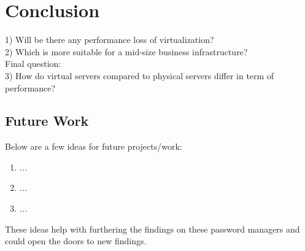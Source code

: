 \section{Conclusion}



        1) Will be there any performance loss of virtualization?\\

        2) Which is more suitable for a mid-size business infrastructure?\\

        Final question:\\
        3) How do virtual servers compared to physical servers differ in term of performance?\\


\subsection{Future Work}
Below are a few ideas for future projects/work:
\begin{enumerate}
    \item \textit{...}
    \item \textit{...}
    \item \textit{...}
\end{enumerate}
These ideas help with furthering the findings on these password managers and could open the doors to new findings.